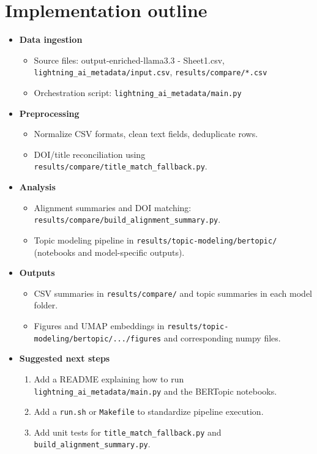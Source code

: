 \documentclass{article}
\begin{document}
\section*{Implementation outline}
\begin{itemize}[leftmargin=*]
\item \textbf{Data ingestion}
    \begin{itemize}
    \item Source files: output-enriched-llama3.3 - Sheet1.csv, \texttt{lightning\_ai\_metadata/input.csv}, \texttt{results/compare/*.csv}
    \item Orchestration script: \texttt{lightning\_ai\_metadata/main.py}
    \end{itemize}
\item \textbf{Preprocessing}
    \begin{itemize}
    \item Normalize CSV formats, clean text fields, deduplicate rows.
    \item DOI/title reconciliation using \texttt{results/compare/title\_match\_fallback.py}.
    \end{itemize}
\item \textbf{Analysis}
    \begin{itemize}
    \item Alignment summaries and DOI matching: \texttt{results/compare/build\_alignment\_summary.py}.
    \item Topic modeling pipeline in \texttt{results/topic-modeling/bertopic/} (notebooks and model-specific outputs).
    \end{itemize}
\item \textbf{Outputs}
    \begin{itemize}
    \item CSV summaries in \texttt{results/compare/} and topic summaries in each model folder.
    \item Figures and UMAP embeddings in \texttt{results/topic-modeling/bertopic/.../figures} and corresponding numpy files.
    \end{itemize}
\item \textbf{Suggested next steps}
    \begin{enumerate}
    \item Add a README explaining how to run \texttt{lightning\_ai\_metadata/main.py} and the BERTopic notebooks.
    \item Add a \texttt{run.sh} or \texttt{Makefile} to standardize pipeline execution.
    \item Add unit tests for \texttt{title\_match\_fallback.py} and \texttt{build\_alignment\_summary.py}.
    \end{enumerate}
\end{itemize}
\end{document}
